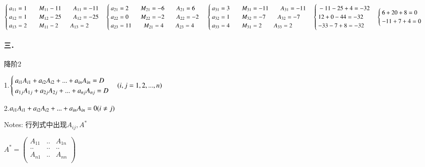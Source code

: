 \documentclass[printbox]{BHCexam}
\begin{document}
\begin{solution}
$\begin{cases}{}
  a_{11}=1  \qquad M_{11}-11  \qquad A_{11}=-11\\
  a_{12}=1  \qquad M_{12}-25  \qquad A_{12}=-25\\
  a_{13}=2  \qquad M_{11}-2  \qquad A_{13}=2
 \end{cases}
 \begin{cases}{}
  a_{21}=2  \qquad M_{21}=-6  \qquad A_{21}=6\\
  a_{22}=0  \qquad M_{22}=-2  \qquad A_{22}=-2\\
  a_{23}=11  \qquad M_{21}=4  \qquad A_{23}=4
 \end{cases}\\
 \begin{cases}{}
  a_{31}=3  \qquad M_{31}=-11  \qquad A_{31}=-11\\
  a_{32}=1  \qquad M_{32}=-7  \qquad A_{32}=-7\\
  a_{33}=4  \qquad M_{31}=2  \qquad A_{33}=2
 \end{cases}
 \begin{cases}{}
  -11-25+4=-32\\
  12+0-44=-32\\
 -33-7+8=-32
 \end{cases}
 \begin{cases}{}
 6+20+8=0\\
 -11+7+4=0
\end{cases}$
\end{solution}

\paragraph{三．}降阶2

1.$\begin{cases}{}
a_{i1}A_{i1}+a_{i2}A_{i2}+...+a_{in}A_{in}=D\\
a_{1j}A_{1j}+a_{2j}A_{2j}+...+a_{nj}A_{nj}=D
 \end{cases}\\
 (i,j=1,2,...,n)$

2.$a_{i1}A_{i1}+a_{i2}A_{i2}+...+a_{in}A_{in}=0\\
 (i \neq j)$

Notes:
行列式中出现$A_{ij},A^{*}$

$A^{*}=\left(                 %
\begin{array}{ccc}   %
   A_{11}& .. & A_{1n} \\  %
  .. & .. & ..\\  %
  A_{n1} & .. & A_{nn}\\ 
\end{array}
\right)$                 %
\end{document}
